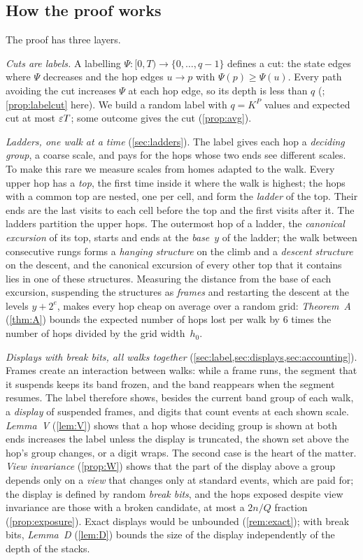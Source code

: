 \subsection{How the proof works}

The proof has three layers.

\emph{Cuts are labels.} A labelling $\Psi:[0,T)\to\{0,\dots,q-1\}$ defines a cut: the state edges where $\Psi$ decreases and the
hop edges $u\to p$ with $\Psi(p)\ge\Psi(u)$. Every path avoiding the cut increases $\Psi$ at each hop edge, so its depth is less than
$q$ (\cite{EighthPaper2026}; \cref{prop:labelcut} here). We build a random label with $q=K^P$ values and expected cut at most
$\varepsilon T$; some outcome gives the cut (\cref{prop:avg}).

\emph{Ladders, one walk at a time} (\cref{sec:ladders}). The label gives each hop a \emph{deciding group}, a coarse scale, and
pays for the hops whose two ends see different scales. To make this rare we measure scales from homes adapted to the walk. Every
upper hop has a \emph{top}, the first time inside it where the walk is highest; the hops with a common top are nested, one per
cell, and form the \emph{ladder} of the top. Their ends are the last visits to each cell before the top and the first visits after
it. The ladders partition the upper hops. The outermost hop of a ladder, the \emph{canonical excursion} of its top, starts and
ends at the \emph{base}~$y$ of the ladder; the walk between consecutive rungs forms a \emph{hanging structure} on the climb and a
\emph{descent structure} on the descent, and the canonical excursion of every other top that it contains lies in one of these
structures. Measuring the distance from the base of each excursion, suspending the structures as \emph{frames} and restarting
the descent at the levels $y+2^e$, makes every hop cheap on average over a random grid: \emph{Theorem~A} (\cref{thm:A}) bounds
the expected number of hops lost per walk by $6$ times the number of hops divided by the grid width~$h_0$.

\emph{Displays with break bits, all walks together} (\cref{sec:label,sec:displays,sec:accounting}). Frames create an interaction
between walks: while a frame runs, the segment that it suspends keeps its band frozen, and the band reappears when the segment
resumes. The label therefore shows, besides the current band group of each walk, a \emph{display} of suspended frames, and
digits that count events at each shown scale.
\emph{Lemma~V} (\cref{lem:V}) shows that a hop whose deciding group is shown at both ends increases the label unless the display
is truncated, the shown set above the hop's group changes, or a digit wraps. The second case is the heart of the matter.
\emph{View invariance} (\cref{prop:W}) shows that the part of the display above a group depends only on a \emph{view} that changes
only at standard events, which are paid for; the display is defined by random \emph{break bits}, and the hops exposed despite
view invariance are those with a broken candidate, at most a $2n/Q$ fraction (\cref{prop:exposure}). Exact displays would be
unbounded (\cref{rem:exact}); with break bits, \emph{Lemma~D} (\cref{lem:D}) bounds the size of the display independently of the
depth of the stacks.

